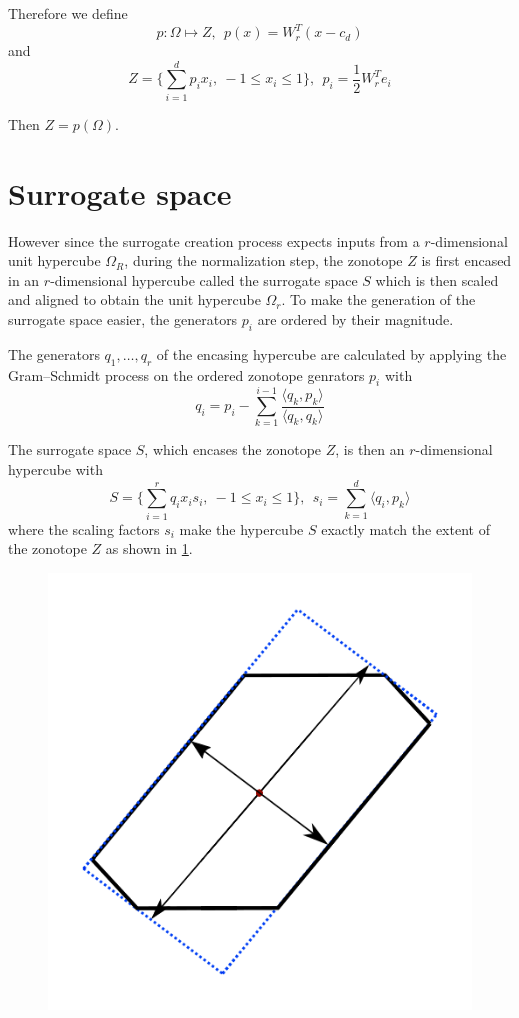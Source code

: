 \documentclass[
  a4paper,  %
  twoside,  %
  bibliography=totoc,
  headsepline,
  cleardoublepage=empty,
  parskip=half,
  draft=false
]{scrbook}
\begin{document}
Therefore we define
\begin{equation}
p \colon \Omega \mapsto Z, ~~ p(x)=W_r^T (x-c_d)
\end{equation}
and
\begin{equation}
Z=\{\sum_{i=1}^d p_i x_i , ~ -1 \leq x_i \leq 1\}, ~~ p_i=\frac{1}{2} W_r^T e_i
\end{equation}

Then $Z=p(\Omega)$.

\section{Surrogate space}

However since the surrogate creation process expects inputs from a $r$-dimensional unit hypercube $\Omega_R$, during the normalization step, the zonotope $Z$ is first encased in an $r$-dimensional hypercube called the surrogate space $S$ which is then scaled and aligned to obtain the unit hypercube $\Omega_r$.
To make the generation of the surrogate space easier, the generators $p_i$ are ordered by their magnitude.

The generators $q_1, \dots, q_r$ of the encasing hypercube are calculated by applying the Gram–Schmidt process on the ordered zonotope genrators $p_i$ with
\begin{equation}
q_i=p_i - \sum_{k=1}^{i-1} \frac{\langle q_k, p_k\rangle}{\langle q_k, q_k\rangle}
\nonumber
\end{equation}

The surrogate space $S$, which encases the zonotope $Z$, is then an $r$-dimensional hypercube with
\begin{equation}
S=\{\sum_{i=1}^r q_i x_i s_i , ~ -1 \leq x_i \leq 1\},~~ s_i=\sum_{k=1}^d \langle q_i, p_k\rangle
\label{surrogate_space}
\end{equation}
where the scaling factors $s_i$ make the hypercube $S$ exactly match the extent of the zonotope $Z$ as shown in \ref{fig:surrogate_space}.


\begin{figure}[H]
\centering
  \includegraphics[width=0.4\linewidth]{graphics/s}
  \label{fig:surrogate_space}
\end{figure}
\end{document}

